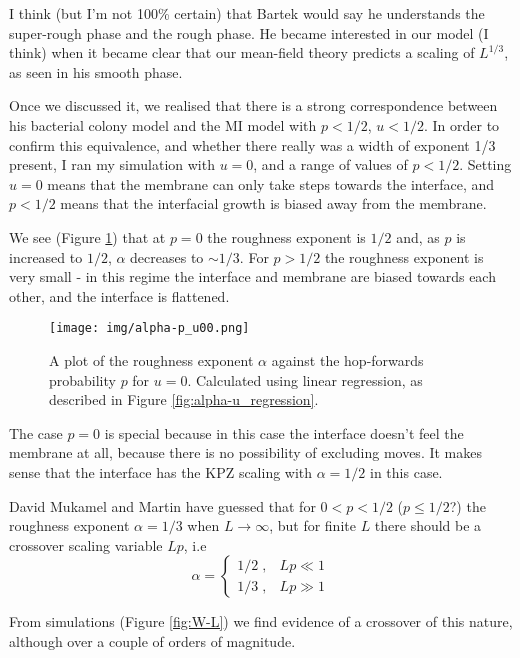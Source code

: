 \documentclass[a4paper,10pt]{article}
\newcommand{\fref}[1]{Figure \ref{#1}}
\begin{document}
I think (but I'm not 100\% certain) that Bartek would say he understands the super-rough phase and the rough phase. He became interested in our model (I think) when it became clear that our mean-field theory predicts a scaling of $L^{1/3}$, as seen in his smooth phase.

Once we discussed it, we realised that there is a strong correspondence between his bacterial colony model and the MI model with $p < 1/2$, $u < 1/2$. In order to confirm this equivalence, and whether there really was a width of exponent 1/3 present, I ran my simulation with $u = 0$, and a range of values of $p< 1/2$. Setting $u=0$ means that the membrane can only take steps towards the interface, and $p<1/2$ means that the interfacial growth is biased away from the membrane.


We see (\fref{fig:alpha-p}) that at $p = 0$ the roughness exponent is $1/2$ and, as $p$ is increased to $1/2$, $\alpha$ decreases to $\sim 1/3$. For $p > 1/2$ the roughness exponent is very small - in this regime the interface and membrane are biased towards each other, and the interface is flattened.

\begin{figure}[h!]
 \centering
 \texttt{[image: img/alpha-p\_u00.png]}
 \caption{A plot of the roughness exponent $\alpha$ against the hop-forwards probability $p$ for $u = 0$. Calculated using linear regression, as described in \fref{fig:alpha-u_regression}.}
 \label{fig:alpha-p}
\end{figure}

The case $p=0$ is special because in this case the interface doesn't feel the membrane at all, because there is no possibility of excluding moves. It makes sense that the interface has the KPZ scaling with $\alpha=1/2$ in this case. 

David Mukamel and Martin have guessed that for $0 < p < 1/2$ ($p \le 1/2$?) the roughness exponent $\alpha = 1/3$ when $L\to\infty$, but for finite $L$ there should be a crossover scaling variable $Lp$, i.e
\begin{equation}
  \alpha = \begin{cases}
             1/2 \;, & Lp \ll 1 \\
             1/3 \;, & Lp \gg 1
           \end{cases}
\end{equation}

From simulations (\fref{fig:W-L}) we find evidence of a crossover of this nature, although over a couple of orders of magnitude.
\end{document}
